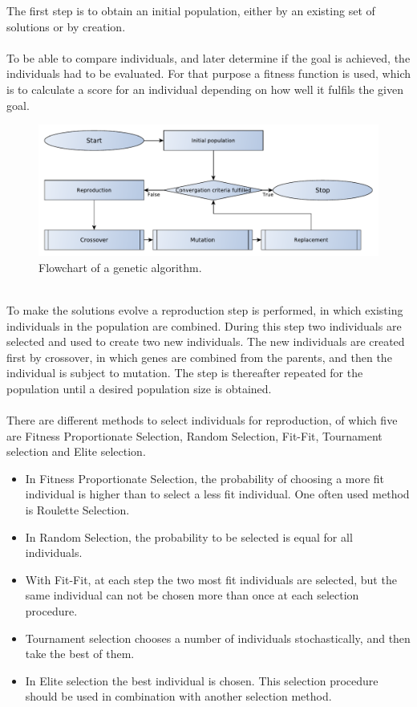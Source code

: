 The first step is to obtain an initial population, either by an existing set of solutions or by creation.\\\\
To be able to compare individuals, and later determine if the goal is achieved, the individuals had to be evaluated. For that purpose a fitness function is used, which is to calculate a score for an individual depending on how well it fulfils the given goal.\label{fitnessf}
\begin{figure}[!htb]
	\centering
	\includegraphics[width=\textwidth]{chapter_4_methods/GeneticFlowChart-Generic}
  	\caption[Flowchart of a genetic algorithm]
  	{Flowchart of a genetic algorithm.}
	\label{GeneticFlowChart-generic}
\end{figure}
\\To make the solutions evolve a reproduction step is performed, in which existing individuals in the population are combined. During this step two individuals are selected and used to create two new individuals. The new individuals are created first by crossover, in which genes are combined from the parents, and then the individual is subject to mutation. The step is thereafter repeated for the population until a desired population size is obtained.\\\\
There are different methods to select individuals for reproduction, of which five are Fitness Proportionate Selection, Random Selection, Fit-Fit, Tournament selection and Elite selection.
\begin{itemize}
\item In Fitness Proportionate Selection, the probability of choosing a more fit individual is higher than to select a less fit individual. One often used method is Roulette Selection.%
\item In Random Selection, the probability to be selected is equal for all individuals. 
\item With Fit-Fit, at each step the two most fit individuals are selected, but the same individual can not be chosen more than once at each selection procedure.
\item Tournament selection chooses a number of individuals stochastically, and then take the best of them.
\item In Elite selection the best individual is chosen. This selection procedure should be used in combination with another selection method.
\end{itemize}
